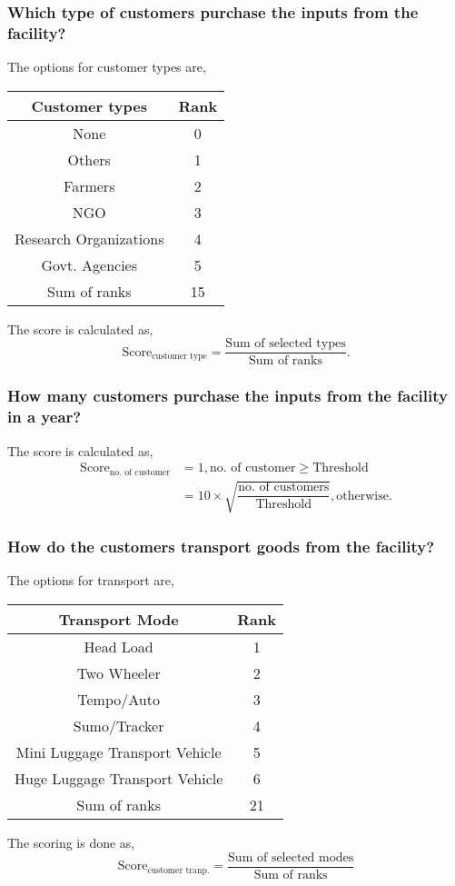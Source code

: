 \documentclass[oneside,twocolumn]{article}
\newcommand{\tsub}[2]{\text{#1}_{\text{#2}}}
\newcommand{\dsub}[2]{\dfrac{\text{#1}}{\text{#2}}}
\newenvironment{ttable}
               {
                 \begin{center}
                   \begin{tabular}{c|c}
                     \hline
               }
               {
                 \\ \hline
                   \end{tabular}
                 \end{center}
               }
\begin{document}
               \subsubsection{Which type of customers purchase the inputs from the facility?}
               The options for customer types are,
               \begin{ttable}
                 Customer types & Rank \\ \hline
                 None & 0 \\
                 Others & 1 \\
                 Farmers & 2 \\
                 NGO & 3 \\
                 Research Organizations & 4 \\
                 Govt. Agencies & 5 \\ \hline
                 Sum of ranks & 15
               \end{ttable}
               The score is calculated as,
               \[
               \tsub{Score}{customer type} = \dsub{Sum of selected types}{Sum of ranks}.
               \]

               \subsubsection{How many customers purchase the inputs from the facility in a year?}
               The score is calculated as,
               \begin{align*}
                 \tsub{Score}{no. of customer} &= 1, \text{no. of customer} \ge \text{Threshold} \\
                 &= 10 \times \sqrt{\dsub{no. of customers}{Threshold}}, \text{otherwise}.
               \end{align*}

               \subsubsection{How do the customers transport goods from the facility?}
               The options for transport are,
               \begin{ttable}
                 Transport Mode & Rank \\ \hline
                 Head Load & 1 \\
                 Two Wheeler & 2 \\
                 Tempo/Auto & 3 \\
                 Sumo/Tracker & 4 \\
                 Mini Luggage Transport Vehicle & 5 \\
                 Huge Luggage Transport Vehicle & 6 \\ \hline
                 Sum of ranks & 21
               \end{ttable}
               The scoring is done as,
               \[
               \tsub{Score}{customer tranp.} = \dsub{Sum of selected modes}{Sum of ranks}
               \]
               
\end{document}
